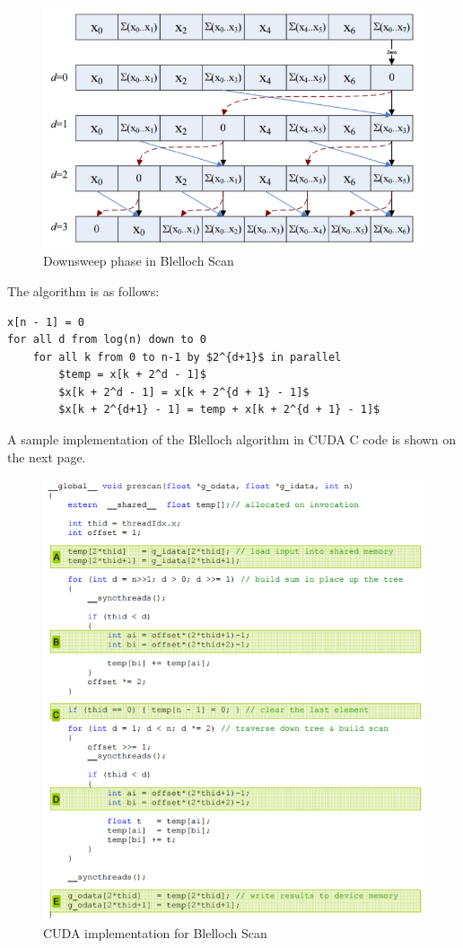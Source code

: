 \documentclass[twoside]{article}
\begin{document}
\begin{figure}[h]
    \centering
    \includegraphics{downsweep}
    \caption{Downsweep phase in Blelloch Scan}
    \label{fig:downsweep}
\end{figure}
\break

The algorithm is as follows:

\begin{lstlisting}[caption=Downsweep Phase, mathescape]
x[n - 1] = 0
for all d from log(n) down to 0
    for all k from 0 to n-1 by $2^{d+1}$ in parallel
        $temp = x[k + 2^d - 1]$
        $x[k + 2^d - 1] = x[k + 2^{d + 1} - 1]$
        $x[k + 2^{d+1} - 1] = temp + x[k + 2^{d + 1} - 1]$
\end{lstlisting}

A sample implementation of the Blelloch algorithm in CUDA C code is shown on the next page.
\newpage
\begin{figure}[h!]
    \centering
    \includegraphics{cuda-blelloch}
    \caption{CUDA implementation for Blelloch Scan}
    \label{fig:cuda-blelloch}
\end{figure}
\newpage
\end{document}
